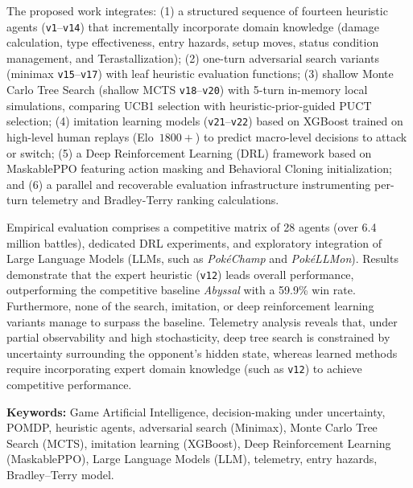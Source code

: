 The proposed work integrates: (1) a structured sequence of fourteen heuristic agents (\texttt{v1}--\texttt{v14}) that incrementally incorporate domain knowledge (damage calculation, type effectiveness, entry hazards, setup moves, status condition management, and Terastallization); (2) one-turn adversarial search variants (minimax \texttt{v15}--\texttt{v17}) with leaf heuristic evaluation functions; (3) shallow Monte Carlo Tree Search (shallow MCTS \texttt{v18}--\texttt{v20}) with 5-turn in-memory local simulations, comparing UCB1 selection with heuristic-prior-guided PUCT selection; (4) imitation learning models (\texttt{v21}--\texttt{v22}) based on XGBoost trained on high-level human replays (Elo~$1800+$) to predict macro-level decisions to attack or switch; (5) a Deep Reinforcement Learning (DRL) framework based on MaskablePPO featuring action masking and Behavioral Cloning initialization; and (6) a parallel and recoverable evaluation infrastructure instrumenting per-turn telemetry and Bradley-Terry ranking calculations.

Empirical evaluation comprises a competitive matrix of 28 agents (over 6.4 million battles), dedicated DRL experiments, and exploratory integration of Large Language Models (LLMs, such as \textit{PokéChamp} and \textit{PokéLLMon}). Results demonstrate that the expert heuristic (\texttt{v12}) leads overall performance, outperforming the competitive baseline \textit{Abyssal} with a 59.9\% win rate. Furthermore, none of the search, imitation, or deep reinforcement learning variants manage to surpass the baseline. Telemetry analysis reveals that, under partial observability and high stochasticity, deep tree search is constrained by uncertainty surrounding the opponent's hidden state, whereas learned methods require incorporating expert domain knowledge (such as \texttt{v12}) to achieve competitive performance.

\vspace{0.5cm}
\noindent\textbf{Keywords:} Game Artificial Intelligence, decision-making under uncertainty, POMDP, heuristic agents, adversarial search (Minimax), Monte Carlo Tree Search (MCTS), imitation learning (XGBoost), Deep Reinforcement Learning (MaskablePPO), Large Language Models (LLM), telemetry, entry hazards, Bradley--Terry model.